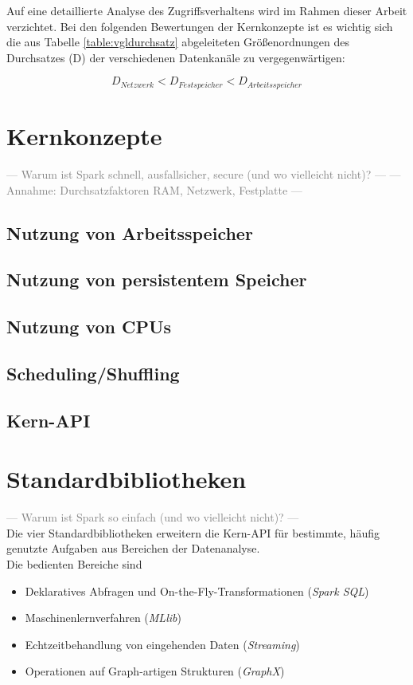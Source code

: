 Auf eine detaillierte Analyse des Zugriffsverhaltens wird im Rahmen dieser Arbeit verzichtet. Bei den folgenden Bewertungen der Kernkonzepte ist es wichtig sich die aus Tabelle \ref{table:vgldurchsatz} abgeleiteten Größenordnungen des Durchsatzes (D) der verschiedenen Datenkanäle zu vergegenwärtigen:

\begin{equation*}
	D_{Netzwerk} < D_{Festspeicher} < D_{Arbeitsspeicher}
\end{equation*}

\section{Kernkonzepte}
\textcolor{gray}{--- Warum ist Spark schnell, ausfallsicher, secure (und wo vielleicht nicht)? ---}
\textcolor{gray}{--- Annahme: Durchsatzfaktoren RAM, Netzwerk, Festplatte ---}
\subsection{Nutzung von Arbeitsspeicher}
\subsection{Nutzung von persistentem Speicher}
\subsection{Nutzung von CPUs}
\subsection{Scheduling/Shuffling}
\subsection{Kern-API}

\section{Standardbibliotheken}
\textcolor{gray}{--- Warum ist Spark so einfach (und wo vielleicht nicht)? ---}\\
Die vier Standardbibliotheken erweitern die Kern-API für bestimmte, häufig genutzte Aufgaben aus Bereichen der Datenanalyse.\\

Die bedienten Bereiche sind
\begin{itemize}
	\item Deklaratives Abfragen und On-the-Fly-Transformationen (\textit{Spark SQL})
	\item Maschinenlernverfahren (\textit{MLlib})
	\item Echtzeitbehandlung von eingehenden Daten (\textit{Streaming})
	\item Operationen auf Graph-artigen Strukturen (\textit{GraphX})
\end{itemize}

